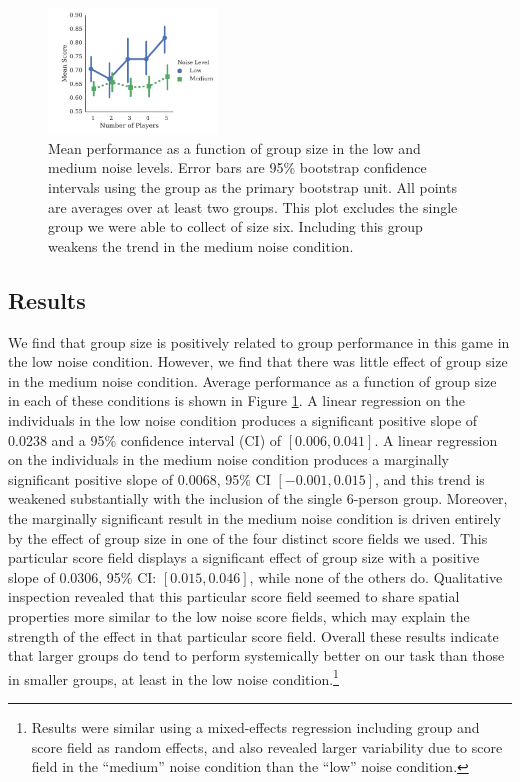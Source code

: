 \documentclass[12pt,letterpaper]{article}
\begin{document}
\begin{figure}[t]
  \centering
  \includegraphics[width=0.4\textwidth]{./figures/performance-summary}
  \caption{Mean performance as a function of group size in the low and
    medium noise levels.  Error bars are 95\% bootstrap confidence
    intervals using the group as the primary bootstrap unit.  All
    points are averages over at least two groups.  This plot excludes
    the single group we were able to collect of size six.  Including
    this group weakens the trend in the medium noise condition.}
  \label{fig:performance}
\end{figure}

\subsection{Results}

We find that group size is positively related to group performance in
this game in the low noise condition.  However, we find that there was
little effect of group size in the medium noise condition.  Average
performance as a function of group size in each of these conditions is
shown in Figure \ref{fig:performance}.  A linear regression on the
individuals in the low noise condition produces a significant positive
slope of 0.0238 and a 95\% confidence interval (CI) of
$[0.006,0.041]$.  A linear regression on the individuals in the medium
noise condition produces a marginally significant positive slope of
$0.0068$, 95\% CI $[-0.001,0.015]$, and this trend is weakened
substantially with the inclusion of the single 6-person group.
Moreover, the marginally significant result in the medium noise
condition is driven entirely by the effect of group size in one of the
four distinct score fields we used.  This particular score field
displays a significant effect of group size with a positive slope of
0.0306, 95\% CI: $[0.015,0.046]$, while none of the others do.
Qualitative inspection revealed that this particular score field
seemed to share spatial properties more similar to the low noise score
fields, which may explain the strength of the effect in that
particular score field.  Overall these results indicate that larger
groups do tend to perform systemically better on our task than those
in smaller groups, at least in the low noise
condition.\footnote{Results were similar using a mixed-effects
  regression including group and score field as random effects, and
  also revealed larger variability due to score field in the
  ``medium'' noise condition than the ``low'' noise condition.}
\end{document}
